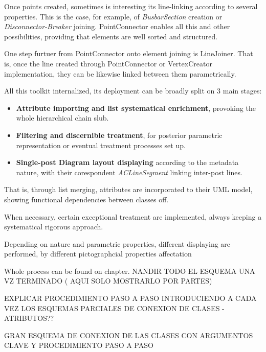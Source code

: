 
Once points created, sometimes is interesting its line-linking according to several properties. This is the case, for example, of \textit{BusbarSection} creation or \textit{Disconnector-Breaker} joining. PointConnector enables all this and other possibilities, providing that elements are well sorted and structured.


One step furtuer from PointConnector onto element joining is LineJoiner. That is, once the line created through PointConnector or VertexCreator implementation, they can be likewise linked between them parametrically.

All this toolkit internalized, its deployment can be broadly split on 3 main stages: 
\begin{itemize}
    \item \textbf{Attribute importing and list systematical enrichment}, provoking the whole hierarchical chain slub.
    \item \textbf{Filtering and discernible treatment}, for posterior parametric representation or eventual treatment processes set up.
    \item \textbf{Single-post Diagram layout displaying} according to the metadata nature, with their corespondent \textit{ACLineSegment} linking inter-post lines.
\end{itemize}

That is, through list merging, attributes are incorporated to their UML model, showing functional dependencies between classes off.

When necessary, certain exceptional treatment are implemented, always keeping a systematical rigorous approach. 

Depending on nature and parametric properties, different displaying are performed, by different pictographcial properties affectation

Whole process can be found on  chapter. NANDIR TODO EL ESQUEMA UNA VZ TERMINADO ( AQUI SOLO MOSTRARLO POR PARTES)

EXPLICAR PROCEDIMIENTO PASO A PASO INTRODUCIENDO A CADA VEZ LOS ESQUEMAS PARCIALES DE CONEXION DE CLASES - ATRIBUTOS??

GRAN ESQUEMA DE CONEXION DE LAS CLASES CON ARGUMENTOS CLAVE Y PROCEDIMIENTO PASO A PASO

